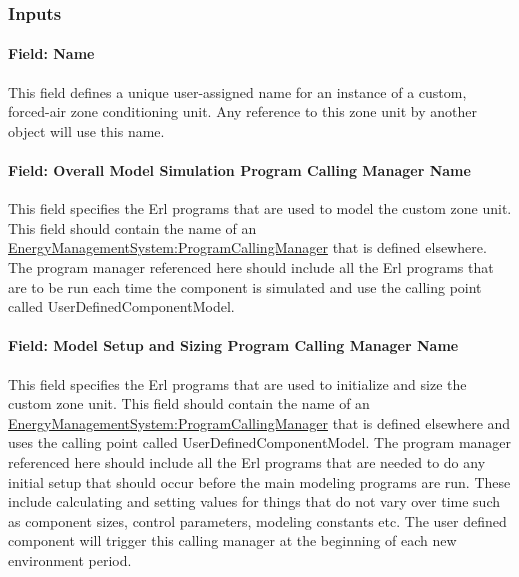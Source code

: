 \subsubsection{Inputs}\label{inputs-050}

\paragraph{Field: Name}\label{field-name-049}

This field defines a unique user-assigned name for an instance of a custom, forced-air zone conditioning unit. Any reference to this zone unit by another object will use this name.

\paragraph{Field: Overall Model Simulation Program Calling Manager Name}\label{field-overall-model-simulation-program-calling-manager-name}

This field specifies the Erl programs that are used to model the custom zone unit. This field should contain the name of an \hyperref[energymanagementsystemprogramcallingmanager]{\hyperref[energymanagementsystemprogram]{EnergyManagementSystem:Program}CallingManager} that is defined elsewhere. The program manager referenced here should include all the Erl programs that are to be run each time the component is simulated and use the calling point called UserDefinedComponentModel.

\paragraph{Field: Model Setup and Sizing Program Calling Manager Name}\label{field-model-setup-and-sizing-program-calling-manager-name}

This field specifies the Erl programs that are used to initialize and size the custom zone unit. This field should contain the name of an \hyperref[energymanagementsystemprogramcallingmanager]{\hyperref[energymanagementsystemprogram]{EnergyManagementSystem:Program}CallingManager} that is defined elsewhere and uses the calling point called UserDefinedComponentModel. The program manager referenced here should include all the Erl programs that are needed to do any initial setup that should occur before the main modeling programs are run. These include calculating and setting values for things that do not vary over time such as component sizes, control parameters, modeling constants etc. The user defined component will trigger this calling manager at the beginning of each new environment period.

